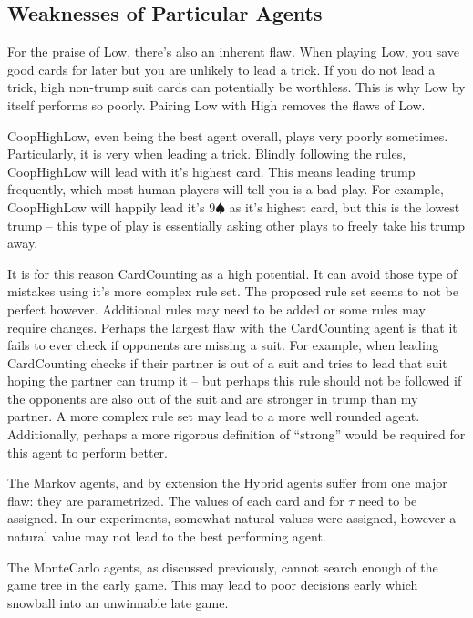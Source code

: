 \subsection{Weaknesses of Particular Agents}

For the praise of Low, there's also an inherent flaw. When playing Low, you save good cards for later but you are unlikely to lead a trick.
If you do not lead a trick, high non-trump suit cards can potentially be worthless. This is why Low by itself performs so poorly. Pairing
Low with High removes the flaws of Low.

CoopHighLow, even being the best agent overall, plays very poorly sometimes. Particularly, it is very when leading a trick. Blindly following
the rules, CoopHighLow will lead with it's highest card. This means leading trump frequently, which most human players will tell you is a bad play.
For example, CoopHighLow will happily lead it's $9\spadesuit$ as it's highest card, but this is the lowest trump -- this type of play is essentially
asking other plays to freely take his trump away.

It is for this reason CardCounting as a high potential. It can avoid those type of mistakes using it's more complex rule set. The proposed rule set
seems to not be perfect however. Additional rules may need to be added or some rules may require changes. Perhaps the largest flaw with the
CardCounting agent is that it fails to ever check if opponents are missing a suit. For example, when leading CardCounting checks if their partner
is out of a suit and tries to lead that suit hoping the partner can trump it -- but perhaps this rule should not be followed if the opponents are also
out of the suit and are stronger in trump than my partner. A more complex rule set may lead to a more well rounded agent. Additionally, perhaps
a more rigorous definition of ``strong'' would be required for this agent to perform better.

The Markov agents, and by extension the Hybrid agents suffer from one major flaw: they are parametrized. The values of each card and for $\tau$
need to be assigned. In our experiments, somewhat natural values were assigned, however a natural value may not lead to the best performing agent.

The MonteCarlo agents, as discussed previously, cannot search enough of the game tree in the early game. This may lead to poor decisions early
which snowball into an unwinnable late game.

